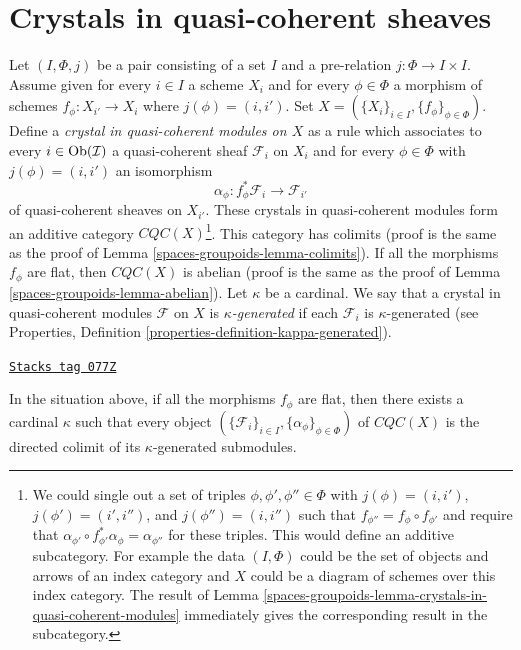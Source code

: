 \section{Crystals in quasi-coherent sheaves}
\label{spaces-groupoids-section-crystals}
Let $(I, \Phi, j)$ be a pair consisting of a set $I$
and a pre-relation $j : \Phi \to I \times I$. Assume given for every
$i \in I$ a scheme $X_i$ and for every $\phi \in \Phi$
a morphism of schemes $f_\phi : X_{i'} \to X_i$ where
$j(\phi) = (i, i')$. Set
$X = (\{X_i\}_{i \in I}, \{f_\phi\}_{\phi \in \Phi})$.
Define a {\it crystal in quasi-coherent modules on $X$}
as a rule which associates to every
$i \in \operatorname{Ob}(\mathcal{I})$ a quasi-coherent sheaf $\mathcal{F}_i$ on $X_i$
and for every $\phi \in \Phi$ with $j(\phi) = (i, i')$ an isomorphism
$$
\alpha_\phi : f_\phi^*\mathcal{F}_i \longrightarrow \mathcal{F}_{i'}
$$
of quasi-coherent sheaves on $X_{i'}$. These crystals in quasi-coherent
modules form an additive category $\textit{CQC}(X)$\footnote{We could single
out a set of triples $\phi, \phi', \phi'' \in \Phi$ with
$j(\phi) = (i, i')$, $j(\phi') = (i', i'')$, and $j(\phi'') = (i, i'')$
such that $f_{\phi''} = f_\phi \circ f_{\phi'}$ and require that
$\alpha_{\phi'} \circ f_{\phi'}^*\alpha_\phi = \alpha_{\phi''}$
for these triples. This would define an additive subcategory.
For example the data $(I, \Phi)$ could be the set of objects and
arrows of an index category and $X$ could be a diagram of schemes over
this index category. The result of
Lemma \ref{spaces-groupoids-lemma-crystals-in-quasi-coherent-modules}
immediately gives the corresponding result in the subcategory.}.
This category has colimits
(proof is the same as the proof of Lemma \ref{spaces-groupoids-lemma-colimits}).
If all the morphisms $f_\phi$ are flat, then $\textit{CQC}(X)$ is
abelian (proof is the same as the proof of Lemma \ref{spaces-groupoids-lemma-abelian}).
Let $\kappa$ be a cardinal. We say that a crystal in quasi-coherent modules
$\mathcal{F}$ on $X$ is {\it $\kappa$-generated} if each $\mathcal{F}_i$ is
$\kappa$-generated (see
Properties, Definition \ref{properties-definition-kappa-generated}).

\begin{lemma}
\label{spaces-groupoids-lemma-crystals-in-quasi-coherent-modules}
\href{https://stacks.math.columbia.edu/tag/077Z}{\texttt{Stacks tag 077Z}}

In the situation above, if all the morphisms $f_\phi$ are flat, then there
exists a cardinal $\kappa$ such that every object
$(\{\mathcal{F}_i\}_{i \in I}, \{\alpha_\phi\}_{\phi \in \Phi})$
of $\textit{CQC}(X)$ is the directed colimit of its
$\kappa$-generated submodules.
\end{lemma}

